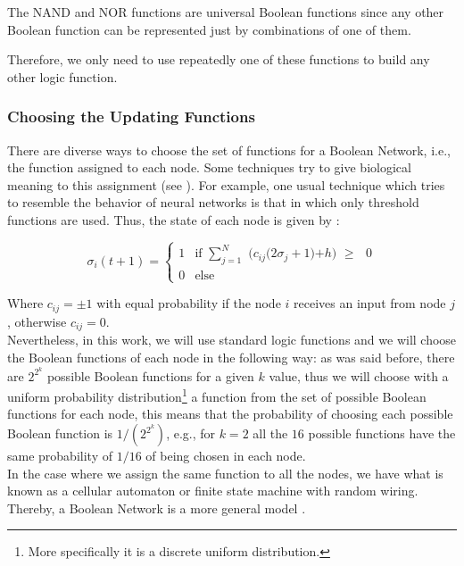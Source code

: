 \begin{defn}
\label{Universal_Boolean_Functions}
	The NAND and NOR functions are universal Boolean functions since any other Boolean function can be represented just by combinations of one of them.
\end{defn}

Therefore, we only need to use repeatedly one of these functions to build any other logic function.

\subsubsection{Choosing the Updating Functions}
\label{functions}
There are diverse ways to choose the set of functions for a Boolean Network, i.e., the function assigned to each node. Some techniques try to give biological meaning to this assignment (see \cite{rbn_barbara}). For example, one usual technique which tries to resemble the behavior of neural networks is that in which only threshold functions are used. Thus, the state of each node is given by \cite{rbn_barbara}:

\begin{equation}
\sigma_{i}(t+1) = \begin{cases}
1 &\text{if $\sum_{j=1}^{N}$ ($c_{ij}$($2\sigma_{j} +1$)+$h$) $\geq$ $0$}\\
0 &\text{else}
\end{cases}
\end{equation}

Where $c_{ij}=\pm 1$ with equal probability if the node $i$ receives an input from node $j$, otherwise $c_{ij}=0$.\\

Nevertheless, in this work, we will use standard logic functions and we will choose the Boolean functions of each node in the following way: as was said before, there are $2^{2^{k}}$ possible  Boolean functions for a given $k$ value, thus we will choose with a uniform probability distribution\footnote{More specifically it is a discrete uniform distribution.} a function from the set of possible Boolean functions for each node, this means that the probability of choosing each possible Boolean function is $1/(2^{2^{k}})$, e.g., for $k=2$ all the $16$ possible functions have the same probability of $1/16$ of being chosen in each node.\\

In the case where we assign the same function to all the nodes, we have what is known as a cellular automaton or finite state machine with random wiring. Thereby, a Boolean Network is a more general model \cite{rbn_barbara}.\\

